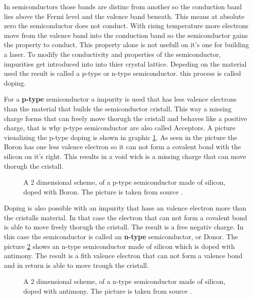 In semiconductors those bands are distinc from another so the conduction band lies above the Fermi level and the valence band beneath.
This means at absolute zero the semiconductor does not conduct.
With rising temperature more electrons move from the valence band into the conduction band so the semiconductor gains the property to conduct.
This property alone is not usefull on it's one for building a laser.
To modify the conductivity and properties of the semiconductor, impurities get introduced into into thier crystal lattice.
Depeding on the material used the result is called a p-type or n-type semiconductor.
this process is called doping.


For a \textbf{p-type} semiconductor a impurity is used that has less valence electrons than the material that builds the semiconductor cristall.
This way a missing charge forms that can freely move thorugh the cristall and behaves like a positive charge, that is why p-type semiconductor are also called Acceptors.
A picture visualizing the p-type doping is shown in graphic \ref{fig:p-type_doping}.
As seen in the picture the Boron has one less valence electron so it can not form a covalent bond with the silicon on it's right.
This results in a void wich is a missing charge that can move thorugh the cristall.

\begin{figure}
    \centering
    \caption{A 2 dimensional scheme, of a p-type semiconductor made of silicon, doped with Boron. The picture is taken from source \cite{p-type_doping}.}
    \label{fig:p-type_doping}
\end{figure}

Doping is also possible with an impurity that hase an valence electron more than the cristalls material.
In that case the electron that can not form a covalent bond is able to move freely thorugh the cristall.
The result is a free negativ charge. In this case the semiconductor is called an \textbf{n-type} semiconductor, or Donor.
The picture \ref{fig:n-type_doping} shows an n-type semiconductor made of silicon which is doped with antimony.
The result is a fith valence electron that can not form a valence bond and in return is able to move trough the cristall.

\begin{figure}
    \centering
    \caption{A 2 dimensional scheme, of a n-type semiconductor made of silicon, doped with antimony. The picture is taken from source \cite{p-type_doping}.}
    \label{fig:n-type_doping}
\end{figure}

